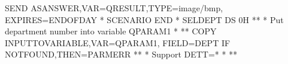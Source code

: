 \documentclass[letterpaper,10pt,english]{sphinxmanual}
\begin{document}
\begin{sphinxVerbatim}[commandchars=\\\{\}]
   SEND\PYGZdl{} AS\PYGZhy{}ANSWER,VAR=\PYGZsq{}QRESULT\PYGZsq{},TYPE=\PYGZsq{}image/bmp\PYGZsq{},               \PYGZhy{}
         EXPIRES=ENDOFDAY
*
   SCENARIO END
*
SELDEPT  DS    0H
*\PYGZhy{}\PYGZhy{}\PYGZhy{}\PYGZhy{}\PYGZhy{}\PYGZhy{}\PYGZhy{}\PYGZhy{}\PYGZhy{}\PYGZhy{}\PYGZhy{}\PYGZhy{}\PYGZhy{}\PYGZhy{}\PYGZhy{}\PYGZhy{}\PYGZhy{}\PYGZhy{}\PYGZhy{}\PYGZhy{}\PYGZhy{}\PYGZhy{}\PYGZhy{}\PYGZhy{}\PYGZhy{}\PYGZhy{}\PYGZhy{}\PYGZhy{}\PYGZhy{}\PYGZhy{}\PYGZhy{}\PYGZhy{}\PYGZhy{}\PYGZhy{}\PYGZhy{}\PYGZhy{}\PYGZhy{}\PYGZhy{}\PYGZhy{}\PYGZhy{}\PYGZhy{}\PYGZhy{}\PYGZhy{}\PYGZhy{}\PYGZhy{}\PYGZhy{}\PYGZhy{}\PYGZhy{}\PYGZhy{}\PYGZhy{}\PYGZhy{}\PYGZhy{}\PYGZhy{}\PYGZhy{}\PYGZhy{}\PYGZhy{}\PYGZhy{}\PYGZhy{}\PYGZhy{}\PYGZhy{}\PYGZhy{}\PYGZhy{}\PYGZhy{}\PYGZhy{}\PYGZhy{}\PYGZhy{}\PYGZhy{}\PYGZhy{}\PYGZhy{}*
* Put department number into variable QPARAM1                         *
*\PYGZhy{}\PYGZhy{}\PYGZhy{}\PYGZhy{}\PYGZhy{}\PYGZhy{}\PYGZhy{}\PYGZhy{}\PYGZhy{}\PYGZhy{}\PYGZhy{}\PYGZhy{}\PYGZhy{}\PYGZhy{}\PYGZhy{}\PYGZhy{}\PYGZhy{}\PYGZhy{}\PYGZhy{}\PYGZhy{}\PYGZhy{}\PYGZhy{}\PYGZhy{}\PYGZhy{}\PYGZhy{}\PYGZhy{}\PYGZhy{}\PYGZhy{}\PYGZhy{}\PYGZhy{}\PYGZhy{}\PYGZhy{}\PYGZhy{}\PYGZhy{}\PYGZhy{}\PYGZhy{}\PYGZhy{}\PYGZhy{}\PYGZhy{}\PYGZhy{}\PYGZhy{}\PYGZhy{}\PYGZhy{}\PYGZhy{}\PYGZhy{}\PYGZhy{}\PYGZhy{}\PYGZhy{}\PYGZhy{}\PYGZhy{}\PYGZhy{}\PYGZhy{}\PYGZhy{}\PYGZhy{}\PYGZhy{}\PYGZhy{}\PYGZhy{}\PYGZhy{}\PYGZhy{}\PYGZhy{}\PYGZhy{}\PYGZhy{}\PYGZhy{}\PYGZhy{}\PYGZhy{}\PYGZhy{}\PYGZhy{}\PYGZhy{}\PYGZhy{}*
   COPY\PYGZdl{} INPUT\PYGZhy{}TO\PYGZhy{}VARIABLE,VAR=\PYGZsq{}QPARAM1\PYGZsq{},                        \PYGZhy{}
         FIELD=\PYGZsq{}DEPT\PYGZsq{}
   IF\PYGZdl{}   NOT\PYGZhy{}FOUND,THEN=PARMERR
*\PYGZhy{}\PYGZhy{}\PYGZhy{}\PYGZhy{}\PYGZhy{}\PYGZhy{}\PYGZhy{}\PYGZhy{}\PYGZhy{}\PYGZhy{}\PYGZhy{}\PYGZhy{}\PYGZhy{}\PYGZhy{}\PYGZhy{}\PYGZhy{}\PYGZhy{}\PYGZhy{}\PYGZhy{}\PYGZhy{}\PYGZhy{}\PYGZhy{}\PYGZhy{}\PYGZhy{}\PYGZhy{}\PYGZhy{}\PYGZhy{}\PYGZhy{}\PYGZhy{}\PYGZhy{}\PYGZhy{}\PYGZhy{}\PYGZhy{}\PYGZhy{}\PYGZhy{}\PYGZhy{}\PYGZhy{}\PYGZhy{}\PYGZhy{}\PYGZhy{}\PYGZhy{}\PYGZhy{}\PYGZhy{}\PYGZhy{}\PYGZhy{}\PYGZhy{}\PYGZhy{}\PYGZhy{}\PYGZhy{}\PYGZhy{}\PYGZhy{}\PYGZhy{}\PYGZhy{}\PYGZhy{}\PYGZhy{}\PYGZhy{}\PYGZhy{}\PYGZhy{}\PYGZhy{}\PYGZhy{}\PYGZhy{}\PYGZhy{}\PYGZhy{}\PYGZhy{}\PYGZhy{}\PYGZhy{}\PYGZhy{}\PYGZhy{}\PYGZhy{}*
* Support DETT=\PYGZsq{}*\PYGZsq{}                                                    *
*\PYGZhy{}\PYGZhy{}\PYGZhy{}\PYGZhy{}\PYGZhy{}\PYGZhy{}\PYGZhy{}\PYGZhy{}\PYGZhy{}\PYGZhy{}\PYGZhy{}\PYGZhy{}\PYGZhy{}\PYGZhy{}\PYGZhy{}\PYGZhy{}\PYGZhy{}\PYGZhy{}\PYGZhy{}\PYGZhy{}\PYGZhy{}\PYGZhy{}\PYGZhy{}\PYGZhy{}\PYGZhy{}\PYGZhy{}\PYGZhy{}\PYGZhy{}\PYGZhy{}\PYGZhy{}\PYGZhy{}\PYGZhy{}\PYGZhy{}\PYGZhy{}\PYGZhy{}\PYGZhy{}\PYGZhy{}\PYGZhy{}\PYGZhy{}\PYGZhy{}\PYGZhy{}\PYGZhy{}\PYGZhy{}\PYGZhy{}\PYGZhy{}\PYGZhy{}\PYGZhy{}\PYGZhy{}\PYGZhy{}\PYGZhy{}\PYGZhy{}\PYGZhy{}\PYGZhy{}\PYGZhy{}\PYGZhy{}\PYGZhy{}\PYGZhy{}\PYGZhy{}\PYGZhy{}\PYGZhy{}\PYGZhy{}\PYGZhy{}\PYGZhy{}\PYGZhy{}\PYGZhy{}\PYGZhy{}\PYGZhy{}\PYGZhy{}\PYGZhy{}*

\end{sphinxVerbatim}
\end{document}
